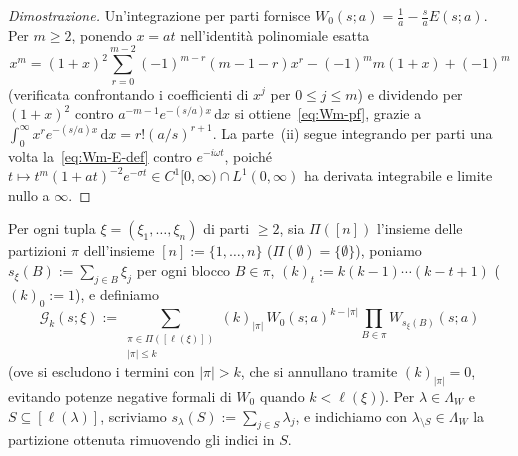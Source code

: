 \documentclass[11pt, reqno]{amsart}
\theoremstyle{remark}
\numberwithin{equation}{section}
\newcommand{\cG}{\mathcal{G}}
\newcommand{\dd}{\,\mathrm{d}}
\begin{document}
\begin{proof}[Dimostrazione]
Un'integrazione per parti fornisce $W_0(s;a) = \frac{1}{a} - \frac{s}{a} E(s;a)$. Per $m \ge 2$, ponendo $x = a t$
nell'identità polinomiale esatta
\[
x^m = (1+x)^2 \sum_{r=0}^{m-2} (-1)^{m-r}(m-1-r) x^r - (-1)^m m(1+x) + (-1)^m
\]
(verificata confrontando i coefficienti di $x^j$ per $0 \le j \le m$) e dividendo per $(1+x)^2$ contro
$a^{-m-1} e^{-(s/a)x}\dd x$ si ottiene~\eqref{eq:Wm-pf}, grazie a $\int_0^\infty x^r e^{-(s/a)x}\dd x = r!(a/s)^{r+1}$.
La parte~(ii) segue integrando per parti una volta la~\eqref{eq:Wm-E-def} contro $e^{-i\omega t}$, poiché
$t \mapsto t^m (1+at)^{-2} e^{-\sigma t} \in C^1[0,\infty) \cap L^1(0,\infty)$ ha derivata integrabile e
limite nullo a $\infty$.
\end{proof}

Per ogni tupla $\xi = (\xi_1,\dots,\xi_n)$ di parti $\ge 2$, sia $\Pi([n])$ l'insieme delle partizioni
$\pi$ dell'insieme $[n] := \{1,\dots,n\}$ ($\Pi(\emptyset) = \{\emptyset\}$), poniamo
$s_\xi(B) := \sum_{j \in B} \xi_j$ per ogni blocco $B \in \pi$, $(k)_t := k(k-1)\cdots(k-t+1)$ ($(k)_0 := 1$),
e definiamo
\begin{equation}\label{eq:Gk-def}
\cG_k(s; \xi) := \sum_{\substack{\pi \in \Pi([\ell(\xi)]) \\ |\pi| \le k}} (k)_{|\pi|}\,
W_0(s; a)^{k - |\pi|} \prod_{B \in \pi} W_{s_\xi(B)}(s; a)
\end{equation}
(ove si escludono i termini con $|\pi| > k$, che si annullano tramite $(k)_{|\pi|} = 0$, evitando
potenze negative formali di $W_0$ quando $k < \ell(\xi)$).
Per $\lambda \in \Lambda_W$ e $S \subseteq [\ell(\lambda)]$, scriviamo $s_\lambda(S) := \sum_{j \in S} \lambda_j$,
e indichiamo con $\lambda_{\setminus S} \in \Lambda_W$ la partizione ottenuta rimuovendo gli indici in $S$.
\end{document}

